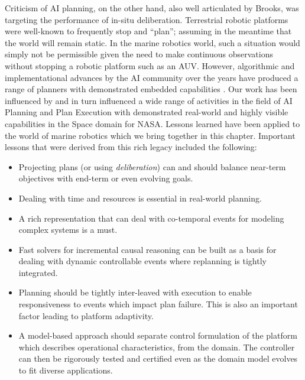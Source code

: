 Criticism of AI planning, on the other hand, also well articulated by
Brooks, was targeting the performance of in-situ
deliberation. Terrestrial robotic platforms were well-known to
frequently stop and ``plan''; assuming in the meantime that the world
will remain static. In the marine robotics world, such a situation
would simply not be permissible given the need to make continuous
observations without stopping a  robotic
platform such as an AUV. However, algorithmic and implementational
advances by the AI community over the years have produced a range of
planners with demonstrated embedded capabilities
\cite{simmons94,Haigh98,alami:1998p820,chien00,mus98,teichteil07}. Our
work has been influenced by and in turn influenced a wide range of
activities in the field of AI Planning and Plan Execution with
demonstrated real-world and highly visible capabilities in the Space
domain \cite{mus98,rajan00,aichang04,bresina05} for NASA. Lessons
learned have been applied to the world of marine robotics which we
bring together in this chapter. Important lessons that were derived
from this rich legacy included the following:

\begin{itemize}

\item Projecting plans (or using \emph{deliberation}) can and should
  balance near-term objectives with end-term or even evolving goals.

\item Dealing with time and resources is essential in real-world
  planning.

\item A rich representation that can deal with co-temporal events for
  modeling complex systems is a must.

\item Fast solvers for incremental causal reasoning can be built as a
  basis for dealing with dynamic controllable events where replanning
  is tightly integrated.

\item Planning should be tightly inter-leaved with execution to enable
  responsiveness to events which impact plan failure. This is also an
  important factor leading to platform adaptivity.

\item A model-based approach should separate control formulation of
  the platform which describes operational characteristics, from the
  domain. The controller can then be rigorously tested and certified
  even as the domain model evolves to fit diverse applications.

\end{itemize}


